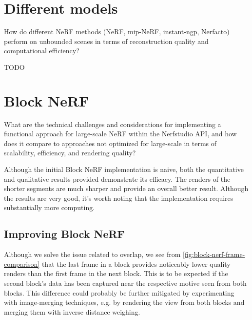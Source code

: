 \section{Different models}
\begin{description}[leftmargin=!,labelwidth=\widthof{RQ 1:}]
\item[\textbf{RQ 3:}] How do different NeRF methods (NeRF, mip-NeRF, instant-ngp, Nerfacto) perform on unbounded scenes in terms of reconstruction quality and computational efficiency?
\end{description}


TODO



\section{Block NeRF}
\begin{description}[leftmargin=!,labelwidth=\widthof{RQ 1:}]
\item[\textbf{RQ 4:}] What are the technical challenges and considerations for implementing a functional approach for large-scale NeRF within the Nerfstudio API, and how does it compare to approaches not optimized for large-scale in terms of scalability, efficiency, and rendering quality?
\end{description}

Although the initial Block NeRF implementation is naive, both the quantitative and qualitative results provided demonstrate its efficacy. The renders of the shorter segments are much sharper and provide an overall better result. Although the results are very good, it's worth noting that the implementation requires substantially more computing. 





\subsection{Improving Block NeRF}

Although we solve the issue related to overlap, we see from \autoref{fig:block-nerf-frame-comparison} that the last frame in a block provides noticeably lower quality renders than the first frame in the next block. This is to be expected if the second block's data has been captured near the respective motive seen from both blocks. This difference could probably be further mitigated by experimenting with image-merging techniques, e.g. by rendering the view from both blocks and merging them with inverse distance weighing.

